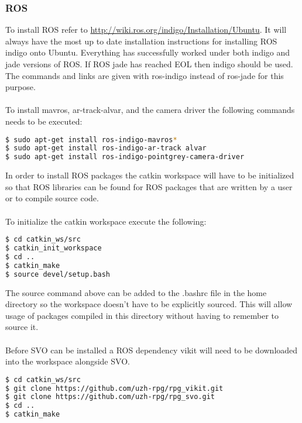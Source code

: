 \subsubsection{ROS}
To install ROS refer to \url{http://wiki.ros.org/indigo/Installation/Ubuntu}. It will always have the most up to date installation instructions for installing ROS indigo onto Ubuntu. Everything has successfully worked under both indigo and jade versions of ROS. If ROS jade has reached EOL then indigo should be used. The commands and links are given with ros-indigo instead of ros-jade for this purpose.\\
\\ 
To install mavros, ar-track-alvar, and the camera driver the following commands needs to be executed:
\begin{lstlisting}[language=bash]
$ sudo apt-get install ros-indigo-mavros*
$ sudo apt-get install ros-indigo-ar-track alvar
$ sudo apt-get install ros-indigo-pointgrey-camera-driver
\end{lstlisting}
In order to install ROS packages the catkin workspace will have to be initialized so that ROS libraries can be found for ROS packages that are written by a user or to compile source code. \\
\\
To initialize the catkin workspace execute the following:
\begin{lstlisting}[language=bash]
$ cd catkin_ws/src
$ catkin_init_workspace
$ cd ..
$ catkin_make
$ source devel/setup.bash
\end{lstlisting}
The source command above can be added to the .bashrc file in the home directory so the workspace doesn't have to be explicitly sourced. This will allow usage of packages compiled in this directory without having to remember to source it. \\
\\
Before SVO can be installed a ROS dependency vikit will need to be downloaded into the workspace alongside SVO.
\begin{lstlisting}[language=bash]
$ cd catkin_ws/src
$ git clone https://github.com/uzh-rpg/rpg_vikit.git
$ git clone https://github.com/uzh-rpg/rpg_svo.git
$ cd ..
$ catkin_make
\end{lstlisting}
